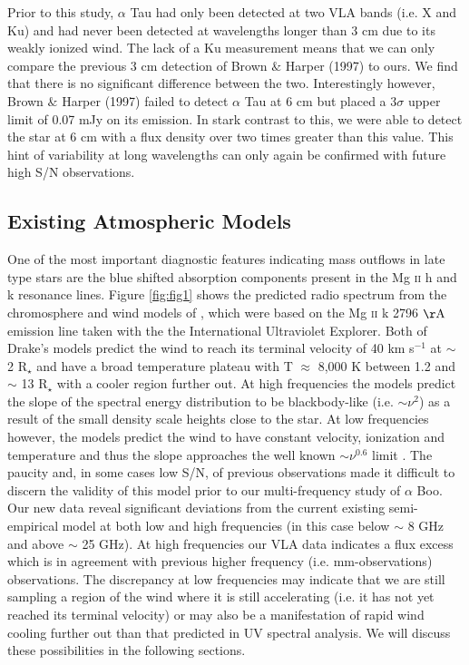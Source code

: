 \documentclass[iop]{emulateapj}
\begin{document}
Prior to this study, $\alpha$ Tau had only been detected at two VLA bands (i.e. X and Ku) and had never been detected at wavelengths longer than 3 cm due to its weakly ionized wind. The lack of a Ku measurement means that we can only compare the previous 3 cm detection of Brown $\&$ Harper (1997) to ours. We find that there is no significant difference between the two. Interestingly however, Brown $\&$ Harper (1997) failed to detect $\alpha$ Tau at 6 cm but placed a 3$\sigma$ upper limit of 0.07 mJy on its emission. In stark contrast to this, we were able to detect the star at 6 cm with a flux density over two times greater than this value. This hint of variability at long wavelengths can only again be confirmed with future high S/N observations.


\subsection{Existing Atmospheric Models} \label{disc2}
One of the most important diagnostic features indicating mass outflows in late type stars are the blue shifted absorption components present in the Mg {\textsc{ii}} h and k resonance lines. Figure \ref{fig:fig1} shows the predicted radio spectrum from the chromosphere and wind models of \cite{1985pssl.proc..351D}, which were based on the Mg {\textsc{ii}} k 2796 $\rm{\AA}$ emission line taken with the the International Ultraviolet Explorer. Both of Drake's models predict the wind to reach its terminal velocity of 40 km s${}^{-1}$ at $\sim$ 2 R${}_{\star}$ and have a broad temperature plateau with T $\approx$ 8,000 K between 1.2 and $\sim$ 13 R${}_{\star}$ with a cooler region further out. At high frequencies the models predict the slope of the spectral energy distribution to be blackbody-like (i.e. $\sim \nu ^{2}$) as a result of the small density scale heights close to the star. At low frequencies however, the models predict the wind to have constant velocity, ionization and temperature and thus the slope approaches the well known $\sim \nu ^{0.6}$ limit \citep{1975MNRAS.170...41W,1975AA....39..217O,1975AA....39....1P}. The paucity and, in some cases low S/N, of previous observations made it difficult to discern the validity of this model prior to our multi-frequency study of $\alpha$ Boo. Our new data reveal significant deviations from the current existing semi-empirical model at both low and high frequencies (in this case below $\sim$ 8 GHz and above $\sim$ 25 GHz). At high frequencies our VLA data indicates a flux excess which is in agreement with previous higher frequency (i.e. mm-observations) observations. The  discrepancy at low frequencies may indicate that we are still sampling a region of the wind where it is still accelerating (i.e. it has not yet reached its terminal velocity) or may also be a manifestation of rapid wind cooling further out than that predicted in UV spectral analysis. We will discuss these possibilities in the following sections.
\end{document}
